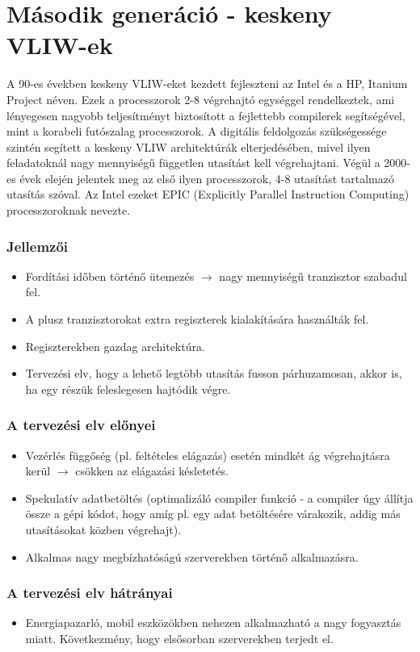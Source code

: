 \section{Második generáció - keskeny VLIW-ek}
A 90-es években keskeny VLIW-eket kezdett fejleszteni az Intel és a HP, Itanium Project néven.
Ezek a processzorok 2-8 végrehajtó egységgel rendelkeztek, ami lényegesen nagyobb teljesítményt biztosított a fejlettebb compilerek segítségével, mint a korabeli futószalag processzorok.
A digitális feldolgozás szükségessége szintén segített a keskeny VLIW architektúrák elterjedésében, mivel ilyen feladatoknál nagy mennyiségű független utasítást kell végrehajtani.
Végül a 2000-es évek elején jelentek meg az első ilyen processzorok, 4-8 utasítást tartalmazó utasítás szóval.
Az Intel ezeket EPIC (Explicitly Parallel Instruction Computing) processzoroknak nevezte.
\subsubsection{Jellemzői}
\begin{itemize}
    \item Fordítási időben történő ütemezés $\rightarrow$ nagy mennyiségű tranzisztor szabadul fel.
    \item A plusz tranzisztorokat extra regiszterek kialakítására használták fel.
    \item Regiszterekben gazdag architektúra.
    \item Tervezési elv, hogy a lehető legtöbb utasítás fusson párhuzamosan, akkor is, ha egy részük feleslegesen hajtódik végre.
\end{itemize}
\subsubsection{A tervezési elv előnyei}
\begin{itemize}
    \item Vezérlés függőség (pl. feltételes elágazás) esetén mindkét ág végrehajtásra kerül $\rightarrow$ csökken az elágazási késletetés.
    \item Spekulatív adatbetöltés (optimalizáló compiler funkció - a compiler úgy állítja össze a gépi kódot, hogy amíg pl. egy adat betöltésére várakozik, addig más utasításokat közben végrehajt).
    \item Alkalmas nagy megbízhatóságú szerverekben történő alkalmazásra.
\end{itemize}
\subsubsection{A tervezési elv hátrányai}
\begin{itemize}
    \item Energiapazarló, mobil eszközökben nehezen alkalmazható a nagy fogyasztás miatt. Következmény, hogy elsősorban szerverekben terjedt el.
\end{itemize}

